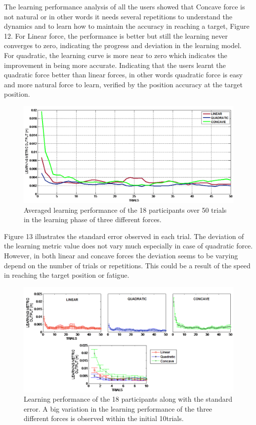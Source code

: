 The learning performance analysis of all the users showed that Concave force is not natural or in other words it needs several repetitions to understand the dynamics and to learn how to maintain the accuracy in reaching a target, Figure 12. For Linear force, the performance is better but still the learning never converges to zero, indicating the progress and deviation in the learning model. For quadratic, the learning curve is more near to zero which indicates the improvement in being more accurate. Indicating that the users learnt the quadratic force better than linear forces, in other words quadratic force is easy and more natural force to learn, verified by the position accuracy at the target position. 
%
\begin{figure}
  \centering
  \includegraphics[scale=0.5]{Chie/figs/Figure12.png}
  \caption{Averaged learning performance of the 18 participants over 50 trials in the learning phase of three different forces.}
  \label{learning}
\end{figure}
Figure 13 illustrates the standard error observed in each trial. The deviation of the learning metric value does not vary much especially in case of quadratic force. However, in both linear and concave forces the deviation seems to be varying depend on the number of trials or repetitions. This could be a result of the speed in reaching the target position or fatigue.
%
\begin{figure}
  \centering
  \includegraphics[scale=0.5]{Chie/figs/Figure13.png}
  \caption{ Learning performance of the 18 participants along with the standard error. A big variation in the learning performance of the three different forces is observed within the initial 10trials.}
  \label{learnerror}
\end{figure}
